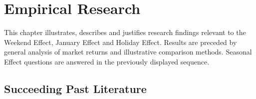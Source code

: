\documentclass[11pt, english]{article}
\begin{document}
\newpage

	\section{Empirical Research}

	This chapter illustrates, describes and justifies research findings relevant to the Weekend Effect, January Effect and Holiday Effect. Results are preceded by general analysis of market returns and illustrative comparison methods. Seasonal Effect questions are answered in the previously displayed sequence.

	\subsection{Succeeding Past Literature}
\end{document}
